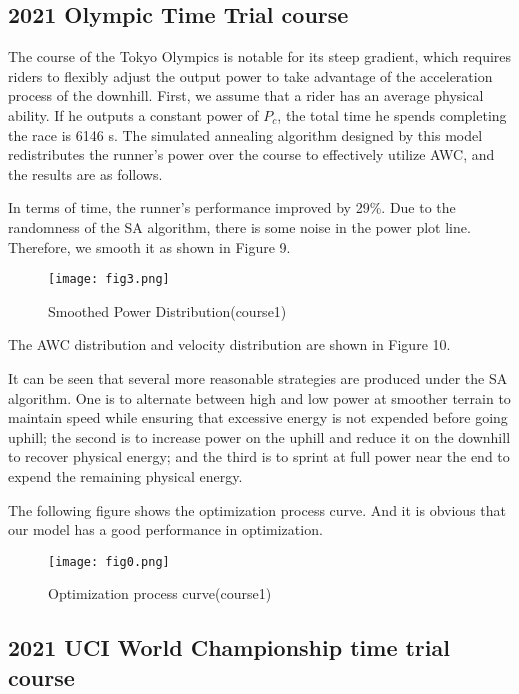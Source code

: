\documentclass{mcmthesis}
\begin{document}
\subsection{2021 Olympic Time Trial course}

The course of the Tokyo Olympics is notable for its steep gradient, which requires riders to flexibly adjust the output power to take advantage of the acceleration process of the downhill. First, we assume that a rider has an average physical ability. If he outputs a constant power of $P_c$, the total time he spends completing the race is 6146 s. The simulated annealing algorithm designed by this model redistributes the runner's power over the course to effectively utilize AWC, and the results are as follows.

In terms of time, the runner's performance improved by 29\%. Due to the randomness of the SA algorithm, there is some noise in the power plot line. Therefore, we smooth it as shown in Figure 9.
 \begin{figure}[h]
 	\small
 	\centering
 	\texttt{[image: fig3.png]}
 	\caption{Smoothed Power Distribution(course1)} 
 \end{figure}

The AWC distribution and velocity distribution are shown in Figure 10.
 \begin{figure}[h]
 	\centering
 	\caption{}
 \end{figure}
 
It can be seen that several more reasonable strategies are produced under the SA algorithm. One is to alternate between high and low power at smoother terrain to maintain speed while ensuring that excessive energy is not expended before going uphill; the second is to increase power on the uphill and reduce it on the downhill to recover physical energy; and the third is to sprint at full power near the end to expend the remaining physical energy.

 The following figure shows the optimization process curve. And it is obvious that our model has a good performance in optimization.
 \begin{figure}[h]
	\small
	\centering
	\texttt{[image: fig0.png]}
	\caption{Optimization process curve(course1)} 
\end{figure}

\subsection{2021 UCI World Championship time trial course}
\end{document}
